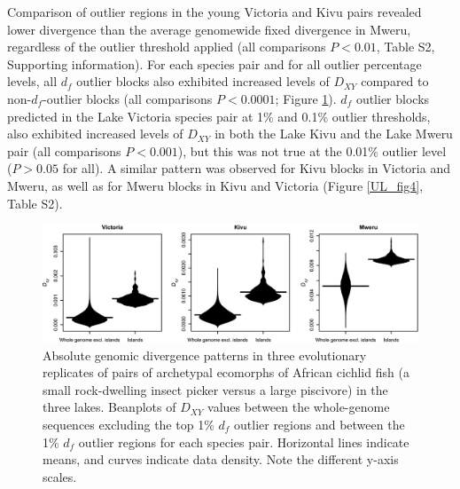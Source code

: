 Comparison of outlier regions in the young Victoria and Kivu pairs revealed lower divergence than the average genomewide fixed divergence in Mweru, regardless of the outlier threshold applied (all comparisons $P < 0.01$, Table S2, Supporting information). For each species pair and for all outlier percentage levels, all $d_f$ outlier blocks also exhibited increased levels of $D_{XY}$ compared to non-$d_f$-outlier blocks (all comparisons $P < 0.0001$; Figure \ref{UL_fig3}). $d_f$ outlier blocks predicted in the Lake Victoria species pair at 1\% and 0.1\% outlier thresholds, also exhibited increased levels of $D_{XY}$ in both the Lake Kivu and the Lake Mweru pair (all comparisons $P < 0.001$), but this was not true at the 0.01\% outlier level ($P > 0.05$ for all). A similar pattern was observed for Kivu blocks in Victoria and Mweru, as well as for Mweru blocks in Kivu and Victoria (Figure \ref{UL_fig4}, Table S2).

\begin{figure}
\centering
\includegraphics[width=\textwidth]{uLakes/figures/fig3}
\caption{Absolute genomic divergence patterns in three evolutionary replicates of pairs of archetypal ecomorphs of African cichlid fish (a small rock-dwelling insect picker versus a large piscivore) in the three lakes. Beanplots of $D_{XY}$ values between the whole-genome sequences excluding the top 1\% $d_f$ outlier regions and between the 1\% $d_f$ outlier regions for each species pair. Horizontal lines indicate means, and curves indicate data density. Note the different y-axis scales.}
\label{UL_fig3}
\end{figure}

